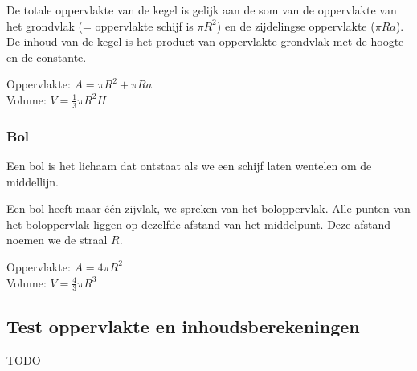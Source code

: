 De totale oppervlakte van de kegel is gelijk aan de som van de oppervlakte van het grondvlak (= oppervlakte schijf is $\pi R^2$) en de zijdelingse oppervlakte ($\pi R a$). De inhoud van de kegel is het product van oppervlakte grondvlak met de hoogte en de constante.




		
\begin{ftonthoud}
			Oppervlakte: $A=\pi R^2 + \pi R a$ 
		\\
		Volume: $V=\frac{1}{3}\pi R^2 H$
\end{ftonthoud}

\subsubsection{Bol}
\begin{definitie}
	Een bol is het lichaam dat ontstaat als we een schijf laten wentelen om de middellijn.
\end{definitie} Een bol heeft maar \'e\'en zijvlak, we spreken van het boloppervlak. 
Alle punten van het boloppervlak liggen op dezelfde afstand van het middelpunt. Deze afstand noemen we de straal $R$.




		
\begin{ftonthoud}
			Oppervlakte: $A=4\pi R^2$
		\\
		Volume: $V=\frac{4}{3}\pi R^3$
\end{ftonthoud}


\subsection{Test oppervlakte en inhoudsberekeningen}
TODO